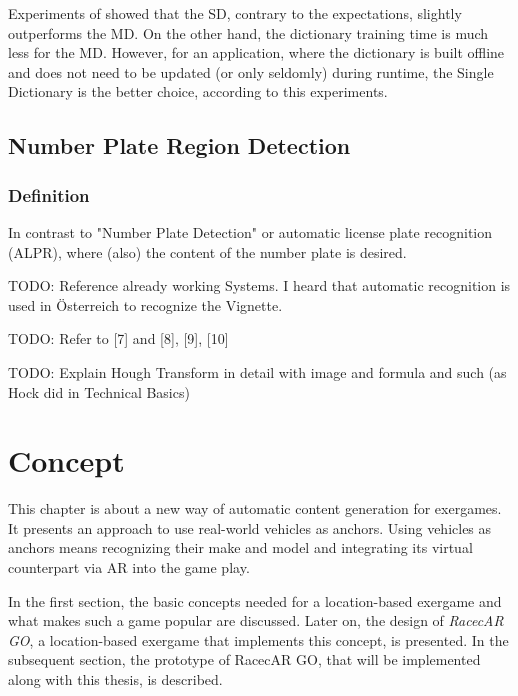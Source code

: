 Experiments of \citep{siddiqui2015robust} showed that the SD, contrary to the expectations, slightly outperforms the MD. On the other hand, the dictionary training time is much less for the MD. However, for an application, where the dictionary is built offline and does not need to be updated (or only seldomly) during runtime, the Single Dictionary is the better choice, according to this experiments.

\section{Number Plate Region Detection}

\subsection{Definition}
In contrast to "Number Plate Detection" or automatic license plate recognition (ALPR), where (also) the content of the number plate is desired.

TODO: Reference already working Systems. I heard that automatic recognition is used in Österreich to recognize the Vignette.

TODO: Refer to [7] and [8], [9], [10]

TODO: Explain Hough Transform in detail with image and formula and such (as Hock did in Technical Basics)







\chapter{Concept}\label{ch:concept}
This chapter is about a new way of automatic content generation for exergames. It presents an approach to use real-world vehicles as anchors. Using vehicles as anchors means recognizing their make and model and integrating its virtual counterpart via AR into the game play.

In the first section, the basic concepts needed for a location-based exergame and what makes such a game popular are discussed. Later on, the design of \emph{RacecAR GO}, a location-based exergame that implements this concept, is presented. In the subsequent section, the prototype of RacecAR GO, that will be implemented along with this thesis, is described.

